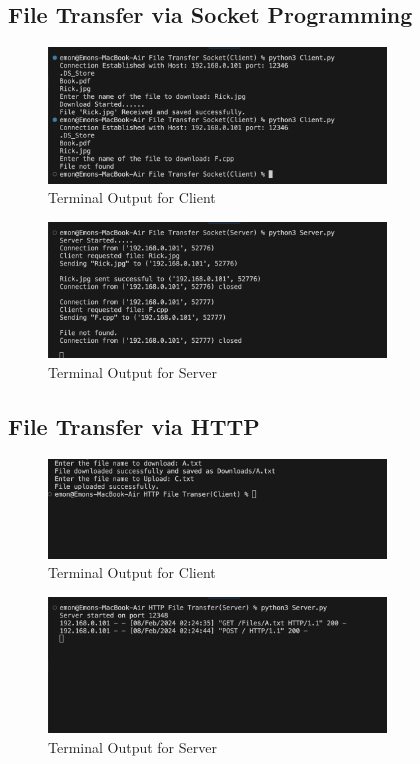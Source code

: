 \documentclass[11pt]{article}
\begin{document}
    \subsection{File Transfer via Socket Programming}
    \begin{figure}[h]
        \centering
        \includegraphics[width=0.8\textwidth]{socket-client.png}
        \caption{Terminal Output for  Client}
        \label{fig:response_message}
    \end{figure}
    \begin{figure}[h]
        \centering
        \includegraphics[width=0.8\textwidth]{socket-server.png}
        \caption{Terminal Output for  Server}
        \label{fig:response_message}
    \end{figure}
\newpage
    \subsection{File Transfer via  HTTP}
    \begin{figure}[h]
        \centering
        \includegraphics[width=0.8\textwidth]{http-client.png}
        \caption{Terminal Output for  Client}
        \label{fig:response_message}
    \end{figure}
    \begin{figure}[h]
        \centering
        \includegraphics[width=0.8\textwidth]{http-server.png}
        \caption{Terminal Output for  Server}
        \label{fig:response_message}
    \end{figure}
\end{document}
